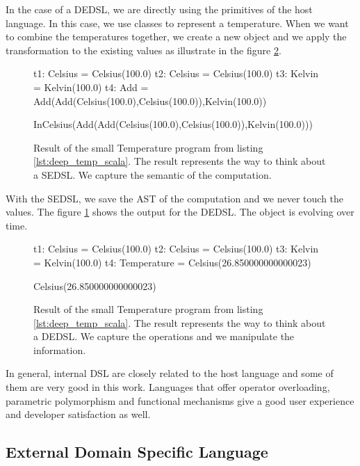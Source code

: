 In the case of a \gls{DEDSL}, we are directly using the primitives of the host
language. In this case, we use classes to represent a temperature. When we want
to combine the temperatures together, we create a new object and we apply the
transformation to the existing values as illustrate in the figure \ref{fig:dsl_deep_result}.

\begin{figure}[ht]
  \centering
  \begin{scalacode}
t1: Celsius = Celsius(100.0)
t2: Celsius = Celsius(100.0)
t3: Kelvin = Kelvin(100.0)
t4: Add = Add(Add(Celsius(100.0),Celsius(100.0)),Kelvin(100.0))

InCelsius(Add(Add(Celsius(100.0),Celsius(100.0)),Kelvin(100.0)))
  \end{scalacode}
  \caption[Result of the \gls{SEDSL} for Temperature]{Result of the small
    Temperature program from listing \ref{lst:deep_temp_scala}. The result
    represents the way to think about a \gls{SEDSL}. We capture the semantic of
    the computation.}
  \label{fig:dsl_shallow_result}
\end{figure}

With the \gls{SEDSL}, we save the \gls{AST} of the computation and we never
touch the values. The figure \ref{fig:dsl_shallow_result} shows the output for
the \gls{DEDSL}. The object is evolving over time.

\begin{figure}[ht]
  \centering
  \begin{scalacode}
t1: Celsius = Celsius(100.0)
t2: Celsius = Celsius(100.0)
t3: Kelvin = Kelvin(100.0)
t4: Temperature = Celsius(26.850000000000023)

Celsius(26.850000000000023)
  \end{scalacode}
  \caption[Result of the \gls{DEDSL} for Temperature]{Result of the small
    Temperature program from listing \ref{lst:deep_temp_scala}. The result
    represents the way to think about a \gls{DEDSL}. We capture the operations and
  we manipulate the information.}
  \label{fig:dsl_deep_result}
\end{figure}

In general, internal \gls{DSL} are closely related to the host language and some
of them are very good in this work. Languages that offer operator overloading,
parametric polymorphism and functional mechanisms give a good user experience
and developer satisfaction as well.

\subsection{External Domain Specific Language}
\label{sec:external_dsl}

